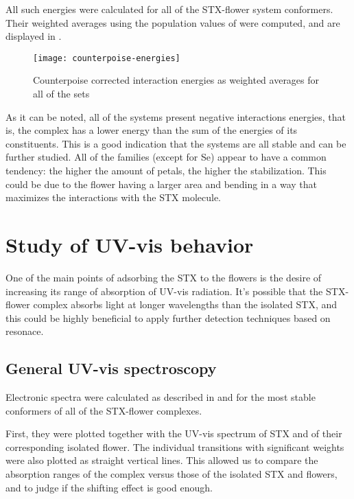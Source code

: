 All such energies were calculated for all of the STX-flower system conformers.
Their weighted averages using the population values of  were computed, and are displayed in .

\begin{figure}
    \texttt{[image: counterpoise-energies]}
    \caption[Counterpoise corrected interaction energies]{Counterpoise corrected interaction energies as weighted averages for all of the sets}
\end{figure}

As it can be noted, all of the systems present negative interactions energies, that is, the complex has a lower energy than the sum of the energies of its constituents.
This is a good indication that the systems are all stable and can be further studied.
All of the families (except for Se) appear to have a common tendency: the higher the amount of petals, the higher the stabilization. This could be due to the flower having a larger area and bending in a way that maximizes the interactions with the STX molecule.

\section{Study of UV-vis behavior}
One of the main points of adsorbing the STX to the flowers is the desire of increasing its range of absorption of UV-vis radiation.
It's possible that the STX-flower complex absorbs light at longer wavelengths than the isolated STX, and this could be highly beneficial to apply further detection techniques based on resonace.

\subsection{General UV-vis spectroscopy}
Electronic spectra were calculated as described in  and  for the most stable conformers of all of the STX-flower complexes.

First, they were plotted together with the UV-vis spectrum of STX and of their corresponding isolated flower.
The individual transitions with significant weights were also plotted as straight vertical lines.
This allowed us to compare the absorption ranges of the complex versus those of the isolated STX and flowers, and to judge if the shifting effect is good enough.

